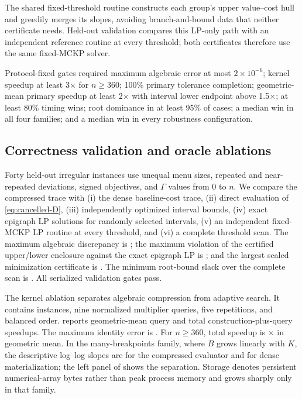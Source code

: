 \documentclass[11pt]{article}
\theoremstyle{plain}
\theoremstyle{definition}
\theoremstyle{remark}
\begin{document}
The shared fixed-threshold routine constructs each group's upper value--cost hull and greedily merges its slopes, avoiding branch-and-bound data that neither certificate needs.  Held-out validation compares this LP-only path with an independent reference routine at every threshold; both certificates therefore use the same fixed-MCKP solver.

Protocol-fixed gates required maximum algebraic error at most $2\times10^{-6}$; kernel speedup at least 3$\times$ for $n\ge360$; 100\% primary tolerance completion; geometric-mean primary speedup at least 2$\times$ with interval lower endpoint above 1.5$\times$; at least 80\% timing wins; root dominance in at least 95\% of cases; a median win in all four families; and a median win in every robustness configuration.

\subsection{Correctness validation and oracle ablations}

Forty held-out irregular instances use unequal menu sizes, repeated and near-repeated deviations, signed objectives, and $\Gamma$ values from 0 to $n$.  We compare the compressed trace with (i) the dense baseline-cost trace, (ii) direct evaluation of \eqref{eq:cancelled-D}, (iii) independently optimized interval bounds, (iv) exact epigraph LP solutions for randomly selected intervals, (v) an independent fixed-MCKP LP routine at every threshold, and (vi) a complete threshold scan.  The maximum algebraic discrepancy is \PubValidationMaxError; the maximum violation of the certified upper/lower enclosure against the exact epigraph LP is \PubValidationCertViolation; and the largest scaled minimization certificate is \PubValidationCertGap.  The minimum root-bound slack over the complete scan is \PubValidationMinSlack.  All serialized validation gates pass.

The kernel ablation separates algebraic compression from adaptive search.  It contains \PubKernelCases{} instances, nine normalized multiplier queries, five repetitions, and balanced order.   reports geometric-mean query and total construction-plus-query speedups.  The maximum identity error is \PubKernelMaxError.  For $n\ge360$, total speedup is \PubKernelLargeSpeedup$\times$ in geometric mean.  In the many-breakpoints family, where $B$ grows linearly with $K$, the descriptive log--log slopes are \PubKernelCompressedSlope{} for the compressed evaluator and \PubKernelDenseSlope{} for dense materialization; the left panel of  shows the separation.  Storage denotes persistent numerical-array bytes rather than peak process memory and grows sharply only in that family.
\end{document}
